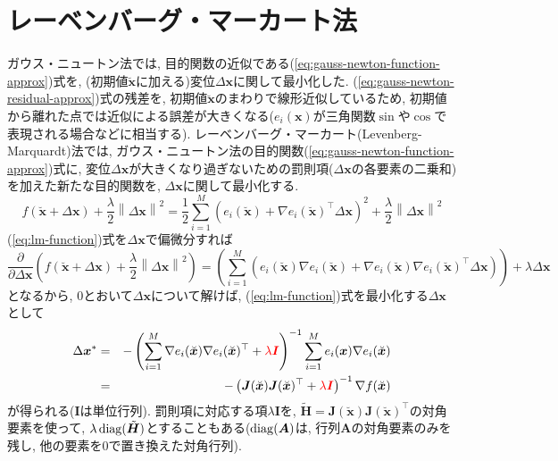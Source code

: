 \documentclass[dvipdfmx,a4paper]{jsarticle}
\begin{document}
\section{レーベンバーグ・マーカート法}
ガウス・ニュートン法では, 目的関数の近似である(\ref{eq:gauss-newton-function-approx})式を, (初期値$\breve{\bm{x}}$に加える)変位$\Delta \bm{x}$に関して最小化した.
(\ref{eq:gauss-newton-residual-approx})式の残差を, 初期値$\breve{\bm{x}}$のまわりで線形近似しているため, 初期値から離れた点では近似による誤差が大きくなる($e_i(\bm{x})$が三角関数$\sin$や$\cos$で表現される場合などに相当する).
レーベンバーグ・マーカート(Levenberg-Marquardt)法では, ガウス・ニュートン法の目的関数(\ref{eq:gauss-newton-function-approx})式に, 変位$\Delta \bm{x}$が大きくなり過ぎないための罰則項($\Delta \bm{x}$の各要素の二乗和)を加えた新たな目的関数を, $\Delta \bm{x}$に関して最小化する.
\begin{equation}
    f(\breve{\bm{x}} + \Delta \bm{x})
    + \frac{\lambda}{2} \left\| \Delta \bm{x} \right\|^2
    = \frac{1}{2} \sum_{i = 1}^M
    \left( e_i(\breve{\bm{x}})
    + \nabla e_i(\breve{\bm{x}})^\top \Delta \bm{x} \right)^2
    + \frac{\lambda}{2} \left\| \Delta \bm{x} \right\|^2
    \label{eq:lm-function}
\end{equation}
(\ref{eq:lm-function})式を$\Delta \bm{x}$で偏微分すれば
\begin{equation}
    \frac{\partial}{\partial \Delta \bm{x}} \left(
    f(\breve{\bm{x}} + \Delta \bm{x})
    + \frac{\lambda}{2} \left\| \Delta \bm{x} \right\|^2 \right)
    = \left( \sum_{i = 1}^M \left( e_i(\breve{\bm{x}}) \nabla e_i(\breve{\bm{x}})
    + \nabla e_i(\breve{\bm{x}}) \nabla e_i(\breve{\bm{x}})^\top \Delta \bm{x} \right) \right)
    + \lambda \Delta \bm{x}
\end{equation}
となるから, $0$とおいて$\Delta \bm{x}$について解けば, (\ref{eq:lm-function})式を最小化する$\Delta \bm{x}$として
\begin{eqnarray}
    \Delta \bm{x}^* &=& -\left( \sum_{i = 1}^M \nabla e_i(\breve{\bm{x}})
    \nabla e_i(\breve{\bm{x}})^\top + {\color{red}\lambda \bm{I}} \right)^{-1}
    \sum_{i = 1}^M e_i(\bm{x}) \nabla e_i(\breve{\bm{x}})
    \label{eq:lm-update} \\
    &=& -\left( \bm{J}(\breve{\bm{x}}) \bm{J}(\breve{\bm{x}})^\top
    + {\color{red}\lambda \bm{I}} \right)^{-1}
    \nabla f(\breve{\bm{x}})
\end{eqnarray}
が得られる($\bm{I}$は単位行列). 罰則項に対応する項$\lambda \bm{I}$を, $\tilde{\bm{H}} = \bm{J}(\breve{\bm{x}}) \bm{J}(\breve{\bm{x}})^\top$の対角要素を使って, $\lambda \operatorname{diag}(\tilde{\bm{H}})$とすることもある($\operatorname{diag}(\bm{A})$は, 行列$\bm{A}$の対角要素のみを残し, 他の要素を$0$で置き換えた対角行列).
\end{document}
